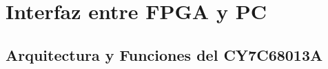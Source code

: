 \chapter{Interfaz entre FPGA y PC}
		
	\section{Arquitectura y Funciones del CY7C68013A}
		


	
		
		
		
		
